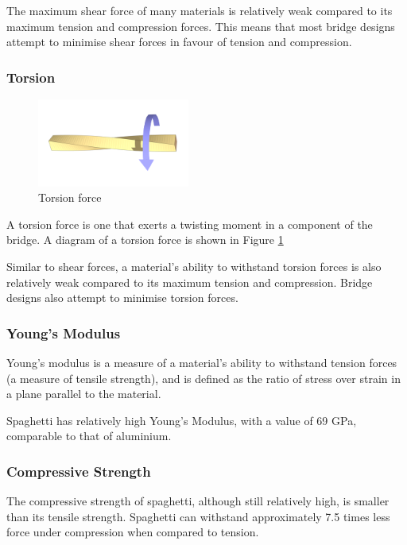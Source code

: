 \documentclass[a4paper,11pt]{article}
\begin{document}
The maximum shear force of many materials is relatively weak compared to its
maximum tension and compression forces.
This means that most bridge designs attempt to minimise shear forces in favour
of tension and compression.


\subsubsection{Torsion}

\begin{figure}
\begin{center}
\includegraphics[width=5cm]{figures/torsion.png}
\end{center}
\caption{Torsion force}
\label{research:torsion}
\end{figure}

A torsion force is one that exerts a twisting moment in a component of the
bridge.
A diagram of a torsion force is shown in Figure \ref{research:torsion}

Similar to shear forces, a material's ability to withstand torsion forces is
also relatively weak compared to its maximum tension and compression.
Bridge designs also attempt to minimise torsion forces.


\subsubsection{Young's Modulus}

Young's modulus is a measure of a material's ability to withstand tension forces
(a measure of tensile strength), and is defined as the ratio of stress over
strain in a plane parallel to the material.

Spaghetti has relatively high Young's Modulus, with a value of 69 GPa,
comparable to that of aluminium.


\subsubsection{Compressive Strength}

The compressive strength of spaghetti, although still relatively high, is
smaller than its tensile strength.
Spaghetti can withstand approximately 7.5 times less force under compression
when compared to tension.
\end{document}
